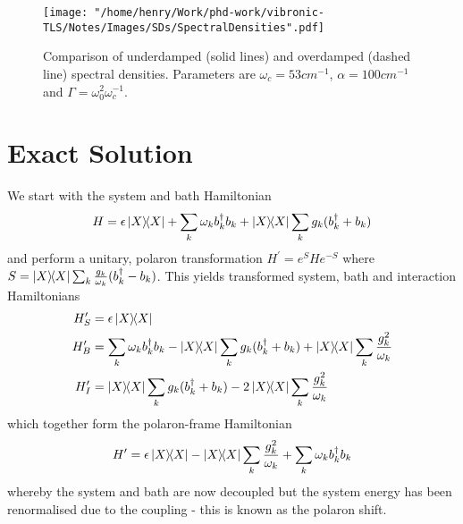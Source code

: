 \documentclass[]{article}
\begin{document}
\begin{figure}
	\texttt{[image: "/home/henry/Work/phd-work/vibronic-TLS/Notes/Images/SDs/SpectralDensities".pdf]}
	\caption{Comparison of underdamped (solid lines) and overdamped (dashed line) spectral densities. Parameters are $\omega_c=53cm^{-1}$, $\alpha=100cm^{-1}$ and $\Gamma=\omega_0^2\omega_c^{-1}$.}
\end{figure}
\section{Exact Solution}
We start with the system and bath Hamiltonian
\begin{equation}
H = \epsilon\dyad{X} + \sum_{k}\omega_k b_k^{\dagger} b_k + \dyad{X}\sum_{k}g_k (b_k^{\dagger}+b_k)
\end{equation}
and perform a unitary, polaron transformation $H^{\prime} = e^{S}He^{-S}$ where $S= \dyad{X}\sum_{k}\frac{g_k}{\omega_k}(b_k^{\dagger}-b_k)$. This yields transformed system, bath and interaction Hamiltonians
\begin{align}
H_S^{\prime} &= \epsilon\dyad{X} \\
H_B^{\prime} &= \sum_{k}\omega_k b_k^{\dagger}b_k - \dyad{X}\sum_{k}g_k (b_k^{\dagger}+b_k) +\dyad{X}\sum_{k}\frac{g^2_k}{\omega_k} \\
H_I^{\prime} &= \dyad{X}\sum_{k}g_k (b_k^{\dagger}+b_k) - 2\dyad{X}\sum_{k}\frac{g^2_k}{\omega_k} \\
\end{align}
which together form the polaron-frame Hamiltonian
\begin{equation}
H^{\prime} = \epsilon\dyad{X} - \dyad{X}\sum_{k}\frac{g^2_k}{\omega_k} + \sum_{k}\omega_k b_k^{\dagger}b_k
\end{equation}
whereby the system and bath are now decoupled but the system energy has been renormalised due to the coupling - this is known as the polaron shift.
\end{document}
